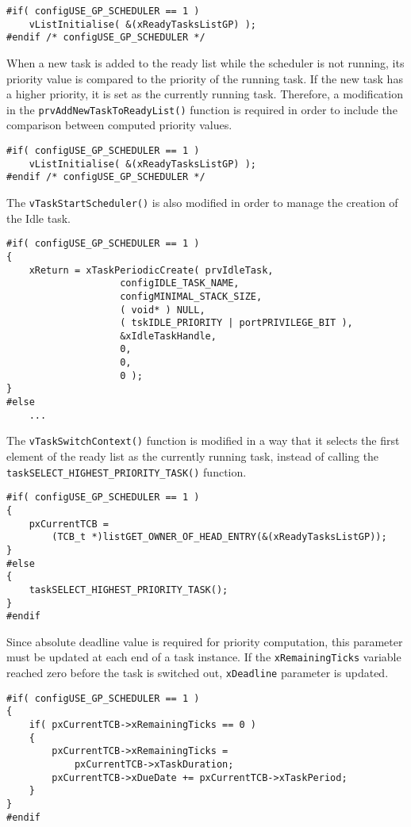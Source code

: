 \begin{lstlisting}[frame=none, label={init_lists}, caption={Initialization of the tasks in the \texttt{ready} list.}, captionpos=b]
#if( configUSE_GP_SCHEDULER == 1 )
	vListInitialise( &(xReadyTasksListGP) );
#endif /* configUSE_GP_SCHEDULER */
\end{lstlisting}
When a new task is added to the ready list while the scheduler is not running, its priority value is compared to the priority of the running task. 
If the new task has a higher priority, it is set as the currently running task.
Therefore, a modification in the \verb$prvAddNewTaskToReadyList()$ function is required in order to include the comparison between computed priority values. 
\begin{lstlisting}[frame=none, label={newtask}, caption={Modification of the \texttt{prvAddNewTaskToReadyList()} function.}, captionpos=b]
#if( configUSE_GP_SCHEDULER == 1 )
	vListInitialise( &(xReadyTasksListGP) );
#endif /* configUSE_GP_SCHEDULER */
\end{lstlisting}
The \verb$vTaskStartScheduler()$ is also modified in order to manage the creation of the Idle task.
\begin{lstlisting}[frame=none, label={idle}, caption={Creation of the Idle task.}, captionpos=b]
#if( configUSE_GP_SCHEDULER == 1 )
{
	xReturn = xTaskPeriodicCreate( prvIdleTask,
					configIDLE_TASK_NAME,
					configMINIMAL_STACK_SIZE,
					( void* ) NULL,
					( tskIDLE_PRIORITY | portPRIVILEGE_BIT ),
					&xIdleTaskHandle,
					0,
					0,
					0 );
}
#else 
	...
\end{lstlisting}
The \verb$vTaskSwitchContext()$ function is modified in a way that it selects the first element of the ready list as the currently running task, instead of calling the \\\verb$taskSELECT_HIGHEST_PRIORITY_TASK()$ function.
\begin{lstlisting}[frame=none, label={switchcontext}, caption={\texttt{vTaskSwitchContext()} modification.}, captionpos=b]
#if( configUSE_GP_SCHEDULER == 1 )
{
	pxCurrentTCB =
		(TCB_t *)listGET_OWNER_OF_HEAD_ENTRY(&(xReadyTasksListGP));
}
#else 
{
	taskSELECT_HIGHEST_PRIORITY_TASK();
}
#endif
\end{lstlisting} 
Since absolute deadline value is required for priority computation, this parameter must be updated at each end of a task instance.
If the \verb$xRemainingTicks$ variable reached zero before the task is switched out, \verb$xDeadline$ parameter is updated.
\begin{lstlisting}[frame=none, label={taskfinish}, caption={\texttt{Updating the \texttt{xDeadline} parameter at the end of task instance}.}, captionpos=b]
#if( configUSE_GP_SCHEDULER == 1 )
{
	if( pxCurrentTCB->xRemainingTicks == 0 ) 
	{
		pxCurrentTCB->xRemainingTicks = 
			pxCurrentTCB->xTaskDuration;
		pxCurrentTCB->xDueDate += pxCurrentTCB->xTaskPeriod;
	}
}
#endif
\end{lstlisting}
